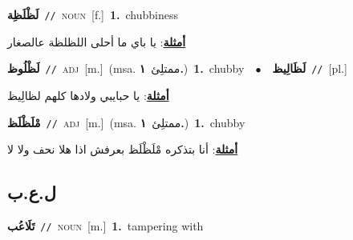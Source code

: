 \documentclass[10pt,a4paper,twoside]{article} %
\begin{document}
\begin{multicols}{2}
{\setlength\topsep{0pt}\textbf{\foreignlanguage{arabic}{لَظْلَظِة}}\ {\color{gray}\texttt{//}\color{black}}\ \textsc{noun}\ [f.]\ \textbf{1.}~chubbiness\  \begin{flushright}\color{gray}\foreignlanguage{arabic}{\textbf{\underline{\foreignlanguage{arabic}{أمثلة}}}: يا باي ما أحلى اللظلظة عالصغار}\end{flushright}\color{black}} \vspace{2mm}

{\setlength\topsep{0pt}\textbf{\foreignlanguage{arabic}{لَظْلُوظ}}\ {\color{gray}\texttt{//}\color{black}}\ \textsc{adj}\ [m.]\ \color{gray}(msa. \foreignlanguage{arabic}{ممتلِئ}~\foreignlanguage{arabic}{\textbf{١.}})\color{black}\ \textbf{1.}~chubby\ \ $\bullet$\ \ \setlength\topsep{0pt}\textbf{\foreignlanguage{arabic}{لَظَالِيظ}}\ {\color{gray}\texttt{//}\color{black}}\ [pl.]\  \begin{flushright}\color{gray}\foreignlanguage{arabic}{\textbf{\underline{\foreignlanguage{arabic}{أمثلة}}}: يا حبايبي ولادها كلهم لظالِيظ}\end{flushright}\color{black}} \vspace{2mm}

{\setlength\topsep{0pt}\textbf{\foreignlanguage{arabic}{مْلَظْلَظ}}\ {\color{gray}\texttt{//}\color{black}}\ \textsc{adj}\ [m.]\ \color{gray}(msa. \foreignlanguage{arabic}{ممتلِئ}~\foreignlanguage{arabic}{\textbf{١.}})\color{black}\ \textbf{1.}~chubby\  \begin{flushright}\color{gray}\foreignlanguage{arabic}{\textbf{\underline{\foreignlanguage{arabic}{أمثلة}}}: أنا بتذكره مْلَظْلَظ بعرفش اذا هلا نحف ولا لا}\end{flushright}\color{black}} \vspace{2mm}

\vspace{-3mm}
\subsection*{\color{blue}\foreignlanguage{arabic}{ل.ع.ب}\color{blue}{}} 

{\setlength\topsep{0pt}\textbf{\foreignlanguage{arabic}{تَلَاعُب}}\ {\color{gray}\texttt{//}\color{black}}\ \textsc{noun}\ [m.]\ \textbf{1.}~tampering with\ } \vspace{2mm}


\end{multicols}
\end{document}
